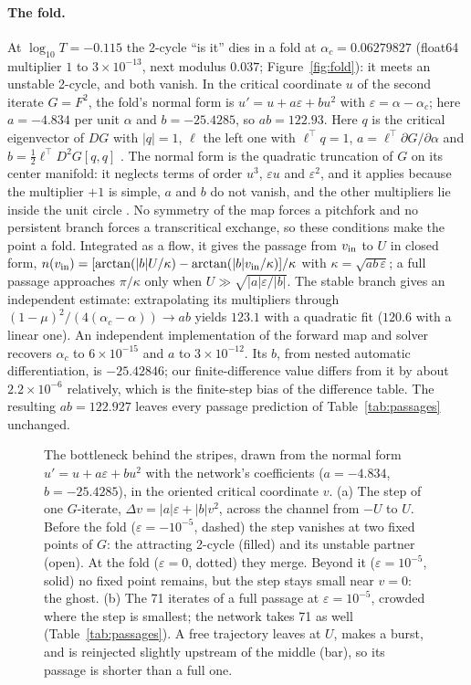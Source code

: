 \documentclass[11pt,letterpaper]{article}
\newcommand{\eps}{\varepsilon}
\begin{document}
\paragraph{The fold.} At $\log_{10}T=-0.115$ the 2-cycle ``is it'' dies in a fold at $\alpha_c=0.06279827$ (float64
multiplier $1$ to $3\times10^{-13}$, next modulus $0.037$; Figure~\ref{fig:fold}): it meets an unstable 2-cycle, and
both vanish. In the critical coordinate $u$ of the second iterate $G=F^2$, the fold's normal form is
$u'=u+a\eps+bu^2$ with $\eps=\alpha-\alpha_c$; here $a=-4.834$ per unit $\alpha$ and $b=-25.4285$, so $ab=122.93$. Here $q$ is the critical eigenvector of $DG$ with $|q|=1$, $\ell$ the left one with $\ell^\top q=1$,
$a=\ell^\top\partial G/\partial\alpha$ and $b=\tfrac12\ell^\top D^2G[q,q]$ \cite{kuznetsov2019maps}. The normal form is
the quadratic truncation of $G$ on its center manifold: it neglects terms of order $u^3$, $\eps u$ and $\eps^2$, and it applies because the multiplier $+1$ is simple, $a$ and $b$ do not vanish, and the other multipliers lie inside
the unit circle \cite{kuznetsov2023elements}. No symmetry of the map forces a pitchfork and no persistent branch forces a
transcritical exchange, so these conditions make the point a fold. Integrated as a flow, it gives the passage from $v_{\rm in}$ to $U$ in closed form,
$n(v_{\rm in})=[\arctan(|b|U/\kappa)-\arctan(|b|v_{\rm in}/\kappa)]/\kappa$ with $\kappa=\sqrt{ab\,\eps}$; a full
passage approaches $\pi/\kappa$ only when $U\gg\sqrt{|a|\eps/|b|}$. The stable branch gives an independent estimate: extrapolating its multipliers
through $(1-\mu)^2/(4(\alpha_c-\alpha))\to ab$ yields $123.1$ with a quadratic fit ($120.6$ with a linear one). An
independent implementation of the forward map and solver recovers $\alpha_c$ to $6\times10^{-15}$ and $a$ to
$3\times10^{-12}$. Its $b$, from nested automatic differentiation, is $-25.42846$; our finite-difference value differs from it by about $2.2\times10^{-6}$ relatively, which is the finite-step bias of the difference table. The
resulting $ab=122.927$ leaves every passage prediction of Table~\ref{tab:passages} unchanged.

\begin{figure}[H]
\centering

\caption{The bottleneck behind the stripes, drawn from the normal form $u'=u+a\eps+bu^2$ with the network's
coefficients ($a=-4.834$, $b=-25.4285$), in the oriented critical coordinate $v$. (a) The step of one $G$-iterate,
$\Delta v=|a|\eps+|b|v^2$, across the channel from $-U$ to $U$. Before the fold ($\eps=-10^{-5}$, dashed) the step
vanishes at two fixed points of $G$: the attracting 2-cycle (filled) and its unstable partner (open). At the fold
($\eps=0$, dotted) they merge. Beyond it ($\eps=10^{-5}$, solid) no fixed point remains, but the step stays small near
$v=0$: the ghost. (b) The 71 iterates of a full passage at $\eps=10^{-5}$, crowded where the step is smallest; the
network takes 71 as well (Table~\ref{tab:passages}). A free trajectory leaves at $U$, makes a burst, and is reinjected
slightly upstream of the middle (bar), so its passage is shorter than a full one.}
\label{fig:bottleneck}
\end{figure}
\end{document}
